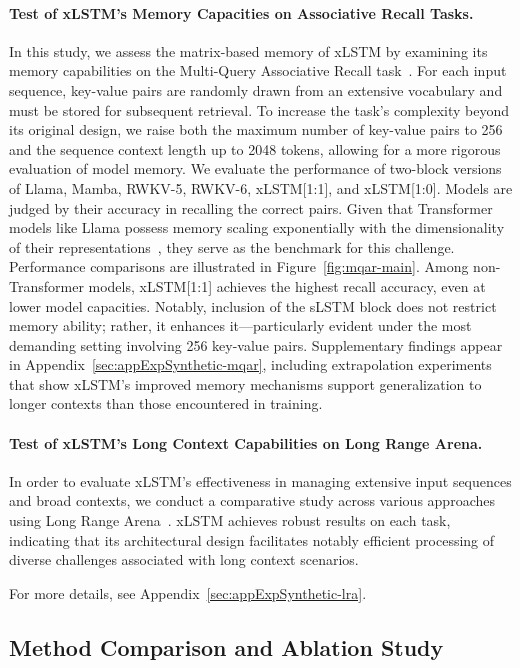 \paragraph{Test of xLSTM's Memory Capacities on Associative Recall Tasks.} In this study, we assess the matrix-based memory of xLSTM by examining its memory capabilities on the Multi-Query Associative Recall task~\citep{Arora:23arxiv}. For each input sequence, key-value pairs are randomly drawn from an extensive vocabulary and must be stored for subsequent retrieval. To increase the task's complexity beyond its original design, we raise both the maximum number of key-value pairs to 256 and the sequence context length up to 2048 tokens, allowing for a more rigorous evaluation of model memory. We evaluate the performance of two-block versions of Llama, Mamba, RWKV-5, RWKV-6, xLSTM[1:1], and xLSTM[1:0]. Models are judged by their accuracy in recalling the correct pairs. Given that Transformer models like Llama possess memory scaling exponentially with the dimensionality of their representations~\citep{Ramsauer:21}, they serve as the benchmark for this challenge. Performance comparisons are illustrated in Figure~\ref{fig:mqar-main}. 
Among non-Transformer models, xLSTM[1:1] achieves the highest recall accuracy, even at lower model capacities. Notably, inclusion of the sLSTM block does not restrict memory ability; rather, it enhances it—particularly evident under the most demanding setting involving 256 key-value pairs. Supplementary findings appear in Appendix~\ref{sec:appExpSynthetic-mqar}, including extrapolation experiments that show xLSTM's improved memory mechanisms support generalization to longer contexts than those encountered in training.

\paragraph{Test of xLSTM's Long Context Capabilities on Long Range Arena.} In order to evaluate xLSTM’s effectiveness in managing extensive input sequences and broad contexts, we conduct a comparative study across various approaches using Long Range Arena~\citep{Tay:21}. xLSTM achieves robust results on each task, indicating that its architectural design facilitates notably efficient processing of diverse challenges associated with long context scenarios.

For more details, see Appendix~\ref{sec:appExpSynthetic-lra}.

\subsection{Method Comparison and Ablation Study}
\label{sec:ExpComparison}

